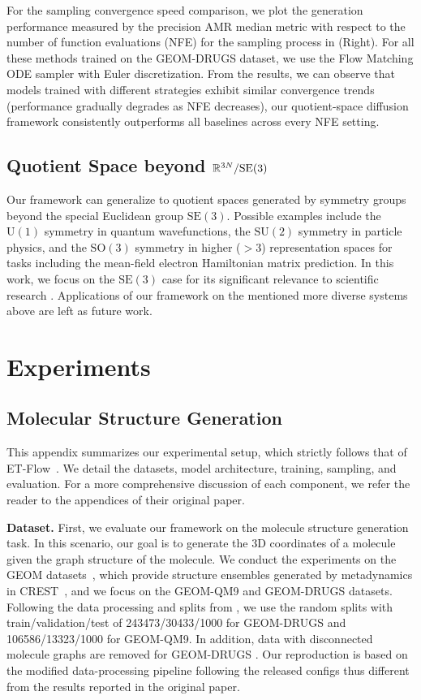 For the sampling convergence speed comparison, we plot the generation performance measured by the precision AMR median metric with respect to the number of function evaluations (NFE) for the sampling process in (Right). For all these methods trained on the GEOM-DRUGS dataset, we use the Flow Matching ODE sampler \citep{lipman2023flow} with Euler discretization. From the results, we can observe that models trained with different strategies exhibit similar convergence trends (performance gradually degrades as NFE decreases), our quotient-space diffusion framework consistently outperforms all baselines across every NFE setting. 

\subsection{Quotient Space beyond $\mathbb{R}^{3N}/\mathrm{SE}(3)$}
Our framework can generalize to 
quotient spaces generated by symmetry groups beyond the special Euclidean group $\mathrm{SE}(3)$. Possible examples include the $\mathrm{U}(1)$ symmetry in quantum wavefunctions, the $\mathrm{SU}(2)$ symmetry in particle physics, 
and the $\mathrm{SO}(3)$ symmetry in higher ($>3$) representation spaces for tasks including the mean-field electron Hamiltonian matrix prediction.
In this work, we focus on the $\mathrm{SE}(3)$ case for its significant relevance to scientific research \citep{abramson2024accurate}. Applications of our framework on the mentioned more diverse systems above are left as future work.

\section{Experiments}\label{appx:experiments}
\subsection{Molecular Structure Generation}\label{appx:geom}
This appendix summarizes our experimental setup, which strictly follows that of ET-Flow~\citep{hassan2024flow}.
We detail the datasets, model architecture, training, sampling, and evaluation. 
For a more comprehensive discussion of each component, we refer the reader to the appendices of their original paper.

\textbf{Dataset.}  First, we evaluate our framework on the molecule structure generation task. In this scenario, our goal is to generate the 3D coordinates of a molecule given the graph structure of the molecule. We conduct the experiments on the GEOM datasets~\citep{axelrod2022geom}, which provide structure ensembles generated by metadynamics in CREST~\citep{pracht2024crest}, and we focus on the GEOM-QM9 and GEOM-DRUGS datasets. Following the data processing and splits from \citep{hassan2024flow}, we use the random splits with train/validation/test of 243473/30433/1000 for GEOM-DRUGS and 106586/13323/1000 for GEOM-QM9. In addition, data with disconnected molecule graphs are removed for GEOM-DRUGS \citep{hassan2024flow}. Our reproduction is based on the modified data-processing pipeline following the released configs thus different from the results reported in the original paper.

